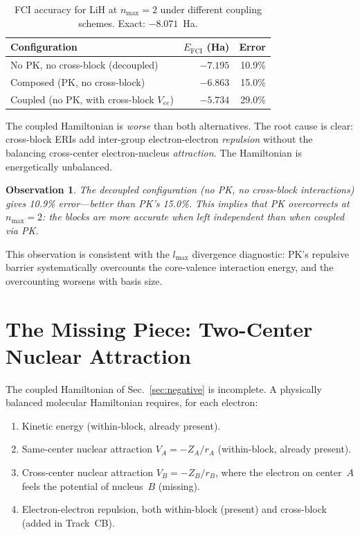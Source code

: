 \documentclass[aps,pra,twocolumn,superscriptaddress,longbibliography]{revtex4-2}
\newtheorem{observation}{Observation}
\begin{document}
\begin{table}[h]
\caption{FCI accuracy for LiH at $n_{\max} = 2$ under different
coupling schemes.  Exact: $-8.071$~Ha.}
\label{tab:fci}
\begin{ruledtabular}
\begin{tabular}{lrr}
Configuration & $E_{\mathrm{FCI}}$ (Ha) & Error \\
\hline
No PK, no cross-block (decoupled) & $-7.195$ & 10.9\% \\
Composed (PK, no cross-block) & $-6.863$ & 15.0\% \\
Coupled (no PK, with cross-block $V_{ee}$) & $-5.734$ & 29.0\% \\
\end{tabular}
\end{ruledtabular}
\end{table}

The coupled Hamiltonian is \emph{worse} than both alternatives.  The
root cause is clear: cross-block ERIs add inter-group electron-electron
\emph{repulsion} without the balancing cross-center electron-nucleus
\emph{attraction}.  The Hamiltonian is energetically unbalanced.

\begin{observation}
\label{obs:decoupled}
The decoupled configuration (no PK, no cross-block interactions)
gives 10.9\% error---better than PK's 15.0\%.  This implies that
PK overcorrects at $n_{\max} = 2$: the blocks are more accurate
when left independent than when coupled via PK.
\end{observation}

This observation is consistent with the $l_{\max}$ divergence
diagnostic: PK's repulsive barrier systematically overcounts the
core-valence interaction energy, and the overcounting worsens with
basis size.


\section{The Missing Piece: Two-Center Nuclear Attraction}
\label{sec:twocenter}

The coupled Hamiltonian of Sec.~\ref{sec:negative} is incomplete.
A physically balanced molecular Hamiltonian requires, for each
electron:
\begin{enumerate}
\item Kinetic energy (within-block, already present).
\item Same-center nuclear attraction $V_A = -Z_A / r_A$ (within-block, already present).
\item Cross-center nuclear attraction $V_B = -Z_B / r_B$, where the
  electron on center~$A$ feels the potential of nucleus~$B$ (missing).
\item Electron-electron repulsion, both within-block (present) and
  cross-block (added in Track~CB).
\end{enumerate}
\end{document}
